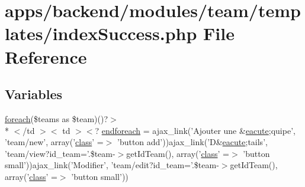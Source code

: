 \hypertarget{backend_2modules_2team_2templates_2index_success_8php}{\section{apps/backend/modules/team/templates/index\-Success.php File Reference}
\label{backend_2modules_2team_2templates_2index_success_8php}
}
\subsection*{Variables}
\begin{DoxyCompactItemize}
\item 
\hyperlink{presse_2modules_2news_2templates_2index_success_8php_abc56db52b2e9a59bcd5c9e45ac5cb332}{foreach}(\$teams as \$team)()?$>$\\*
$<$/td $>$$<$ td $>$$<$? \hyperlink{backend_2modules_2team_2templates_2index_success_8php_a1cbcd663ddebc10908570169f6e8515f}{endforeach} = ajax\-\_\-link('Ajouter une \&\hyperlink{presse_2modules_2page_2templates_2concours_ouikos_success_8php_a5c9a34c76cebfd8ae481fa185a4530af}{eacute};quipe', 'team/new', array('\hyperlink{live_2modules_2news_2templates_2__actualitelight_8php_a185c73c6507391d1eb38c776b68ce96d}{class}' =$>$ 'button add'))ajax\-\_\-link('D\&\hyperlink{presse_2modules_2page_2templates_2concours_ouikos_success_8php_a5c9a34c76cebfd8ae481fa185a4530af}{eacute};tails', 'team/view?id\-\_\-team='.\$team-\/$>$get\-Id\-Team(), array('\hyperlink{live_2modules_2news_2templates_2__actualitelight_8php_a185c73c6507391d1eb38c776b68ce96d}{class}' =$>$ 'button small'))ajax\-\_\-link('Modifier', 'team/edit?id\-\_\-team='.\$team-\/$>$get\-Id\-Team(), array('\hyperlink{live_2modules_2news_2templates_2__actualitelight_8php_a185c73c6507391d1eb38c776b68ce96d}{class}' =$>$ 'button small'))
\end{DoxyCompactItemize}


